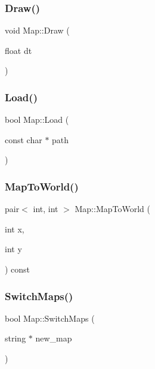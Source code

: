 \mbox{\label{class_map_acdc0e71bae7daf3276b81249f273122c}} 
\subsubsection{\texorpdfstring{Draw()}{Draw()}}
{\footnotesize\ttfamily void Map\+::\+Draw (\begin{DoxyParamCaption}\item[{float}]{dt }\end{DoxyParamCaption})}

\mbox{\label{class_map_a3fcd66c685b1cc8a33097fd06ccbfad9}} 
\subsubsection{\texorpdfstring{Load()}{Load()}}
{\footnotesize\ttfamily bool Map\+::\+Load (\begin{DoxyParamCaption}\item[{const char $\ast$}]{path }\end{DoxyParamCaption})}

\mbox{\label{class_map_a178908c6cbd28edff73b363707c21482}} 
\subsubsection{\texorpdfstring{MapToWorld()}{MapToWorld()}}
{\footnotesize\ttfamily pair$<$ int, int $>$ Map\+::\+Map\+To\+World (\begin{DoxyParamCaption}\item[{int}]{x,  }\item[{int}]{y }\end{DoxyParamCaption}) const}

\mbox{\label{class_map_a87d365ff3aa0fe1f9683879f6f089812}} 
\subsubsection{\texorpdfstring{SwitchMaps()}{SwitchMaps()}}
{\footnotesize\ttfamily bool Map\+::\+Switch\+Maps (\begin{DoxyParamCaption}\item[{string $\ast$}]{new\+\_\+map }\end{DoxyParamCaption})}

